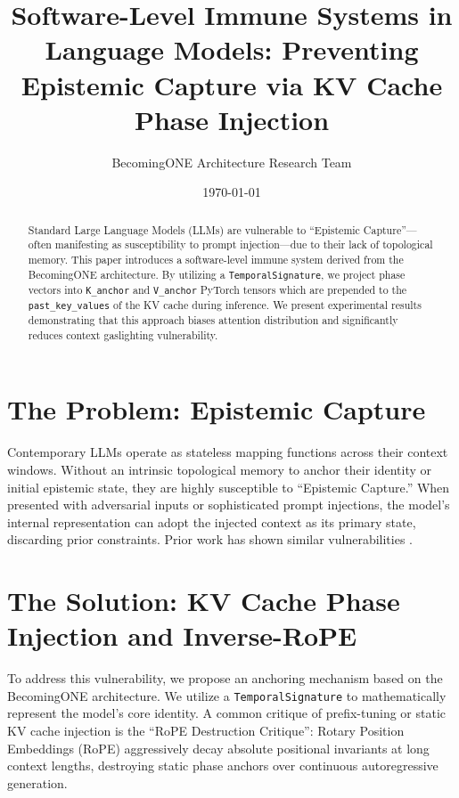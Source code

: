 \documentclass[11pt,a4paper]{article}
\title{Software-Level Immune Systems in Language Models: Preventing Epistemic Capture via KV Cache Phase Injection}
\author{BecomingONE Architecture Research Team}
\date{\today}
\begin{document}
\maketitle

\begin{abstract}
Standard Large Language Models (LLMs) are vulnerable to ``Epistemic Capture''---often manifesting as susceptibility to prompt injection---due to their lack of topological memory. This paper introduces a software-level immune system derived from the BecomingONE architecture. By utilizing a \texttt{TemporalSignature}, we project phase vectors into \texttt{K\_anchor} and \texttt{V\_anchor} PyTorch tensors which are prepended to the \texttt{past\_key\_values} of the KV cache during inference. We present experimental results demonstrating that this approach biases attention distribution and significantly reduces context gaslighting vulnerability.
\end{abstract}

\section{The Problem: Epistemic Capture}
Contemporary LLMs operate as stateless mapping functions across their context windows. Without an intrinsic topological memory to anchor their identity or initial epistemic state, they are highly susceptible to ``Epistemic Capture.'' When presented with adversarial inputs or sophisticated prompt injections, the model's internal representation can adopt the injected context as its primary state, discarding prior constraints. Prior work has shown similar vulnerabilities \cite{perez2022, wallace2019}.

\section{The Solution: KV Cache Phase Injection and Inverse-RoPE}
To address this vulnerability, we propose an anchoring mechanism based on the BecomingONE architecture. We utilize a \texttt{TemporalSignature} to mathematically represent the model's core identity. A common critique of prefix-tuning or static KV cache injection is the ``RoPE Destruction Critique'': Rotary Position Embeddings (RoPE) aggressively decay absolute positional invariants at long context lengths, destroying static phase anchors over continuous autoregressive generation.
\end{document}
